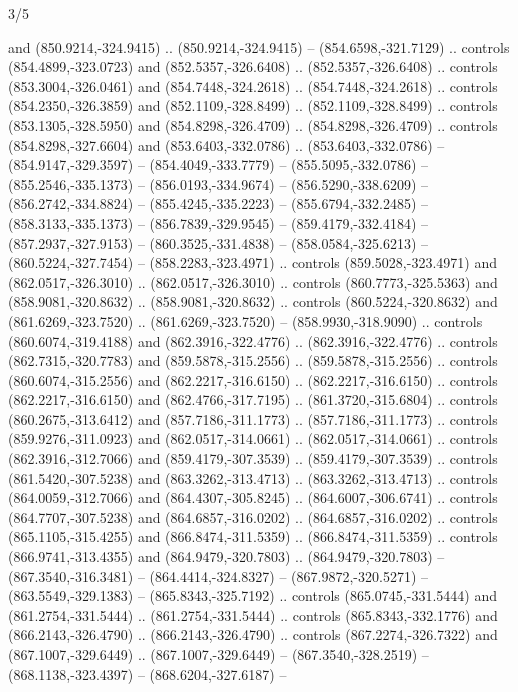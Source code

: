 \begin{flagdescription}{3/5}
\begin{scope}[xshift=0.5\flaglength,yshift=0.5\flagwidth,scale=\flagwidth/99]
\begin{scope}[y=0.8pt, x=0.8pt, yscale=-0.20628, xscale=0.20628,shift={(-500,-300)}]
\begin{scope}[cm={{0.79646,0.0,0.0,0.7753,(100.0721,273.79617)}}]
\begin{scope}[cm={{1.08438,0.0,0.0,1.08438,(-425.76596,333.57046)}}]
  and (850.9214,-324.9415) .. (850.9214,-324.9415) -- (854.6598,-321.7129) ..
  controls (854.4899,-323.0723) and (852.5357,-326.6408) .. (852.5357,-326.6408)
  .. controls (853.3004,-326.0461) and (854.7448,-324.2618) ..
  (854.7448,-324.2618) .. controls (854.2350,-326.3859) and (852.1109,-328.8499)
  .. (852.1109,-328.8499) .. controls (853.1305,-328.5950) and
  (854.8298,-326.4709) .. (854.8298,-326.4709) .. controls (854.8298,-327.6604)
  and (853.6403,-332.0786) .. (853.6403,-332.0786) -- (854.9147,-329.3597) --
  (854.4049,-333.7779) -- (855.5095,-332.0786) -- (855.2546,-335.1373) --
  (856.0193,-334.9674) -- (856.5290,-338.6209) -- (856.2742,-334.8824) --
  (855.4245,-335.2223) -- (855.6794,-332.2485) -- (858.3133,-335.1373) --
  (856.7839,-329.9545) -- (859.4179,-332.4184) -- (857.2937,-327.9153) --
  (860.3525,-331.4838) -- (858.0584,-325.6213) -- (860.5224,-327.7454) --
  (858.2283,-323.4971) .. controls (859.5028,-323.4971) and (862.0517,-326.3010)
  .. (862.0517,-326.3010) .. controls (860.7773,-325.5363) and
  (858.9081,-320.8632) .. (858.9081,-320.8632) .. controls (860.5224,-320.8632)
  and (861.6269,-323.7520) .. (861.6269,-323.7520) -- (858.9930,-318.9090) ..
  controls (860.6074,-319.4188) and (862.3916,-322.4776) .. (862.3916,-322.4776)
  .. controls (862.7315,-320.7783) and (859.5878,-315.2556) ..
  (859.5878,-315.2556) .. controls (860.6074,-315.2556) and (862.2217,-316.6150)
  .. (862.2217,-316.6150) .. controls (862.2217,-316.6150) and
  (862.4766,-317.7195) .. (861.3720,-315.6804) .. controls (860.2675,-313.6412)
  and (857.7186,-311.1773) .. (857.7186,-311.1773) .. controls
  (859.9276,-311.0923) and (862.0517,-314.0661) .. (862.0517,-314.0661) ..
  controls (862.3916,-312.7066) and (859.4179,-307.3539) .. (859.4179,-307.3539)
  .. controls (861.5420,-307.5238) and (863.3262,-313.4713) ..
  (863.3262,-313.4713) .. controls (864.0059,-312.7066) and (864.4307,-305.8245)
  .. (864.6007,-306.6741) .. controls (864.7707,-307.5238) and
  (864.6857,-316.0202) .. (864.6857,-316.0202) .. controls (865.1105,-315.4255)
  and (866.8474,-311.5359) .. (866.8474,-311.5359) .. controls
  (866.9741,-313.4355) and (864.9479,-320.7803) .. (864.9479,-320.7803) --
  (867.3540,-316.3481) -- (864.4414,-324.8327) -- (867.9872,-320.5271) --
  (863.5549,-329.1383) -- (865.8343,-325.7192) .. controls (865.0745,-331.5444)
  and (861.2754,-331.5444) .. (861.2754,-331.5444) .. controls
  (865.8343,-332.1776) and (866.2143,-326.4790) .. (866.2143,-326.4790) ..
  controls (867.2274,-326.7322) and (867.1007,-329.6449) .. (867.1007,-329.6449)
  -- (867.3540,-328.2519) -- (868.1138,-323.4397) -- (868.6204,-327.6187) --

\end{scope}
\end{scope}
\end{scope}
\end{scope}
\end{flagdescription}
